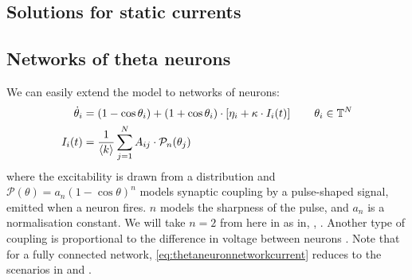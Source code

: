 \subsection{Solutions for static currents}


\subsection{Networks of theta neurons}
We can easily extend the model to networks of neurons:
\begin{align}
\dot{\theta}_{i} &=\left(1-\cos \theta_{i}\right)+\left(1+\cos \theta_{i}\right) \cdot \left[\eta_{i} + \kappa \cdot I_{i}(t)\right] \qquad \theta_i \in {\mathbb{T}}^N  \label{eq:thetaneuronnetwork} \\
I_{i}(t) &=\frac{1}{{\langle k\rangle}} \sum_{j=1}^{N} A_{i j} \cdot \mathcal{P}_{n}(\theta_{j}) \label{eq:thetaneuronnetworkcurrent}
\end{align}
where the excitability is drawn from a distribution and $\mathcal{P}(\theta)  = a_n(1 - \cos \theta)^n$ models synaptic coupling by a pulse-shaped signal, emitted when a neuron fires. $n$ models the sharpness of the pulse, and $a_n$ is a normalisation constant. We will take $n=2$ from here in as in\cite{Luke2013}, \cite{OttAntonsen2017}, \cite{Martens2020}. Another type of coupling is proportional to the difference in voltage between neurons \cite{Martens2020}. Note that for a fully connected network, \eqref{eq:thetaneuronnetworkcurrent} reduces to the scenarios in \cite{Luke2013} and \cite{Martens2020}.


